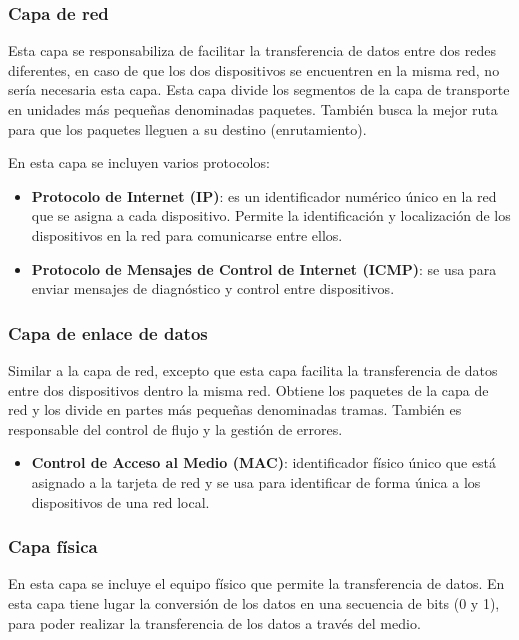 \subsubsection{Capa de red}
\label{subsubsec:CapaRed}
Esta capa se responsabiliza de facilitar la transferencia de datos entre dos redes diferentes, en caso de que los dos dispositivos se encuentren en la misma red, no sería necesaria esta capa. Esta capa divide los segmentos de la capa de transporte en unidades más pequeñas denominadas paquetes. También busca la mejor ruta para que los paquetes lleguen a su destino (enrutamiento).

En esta capa se incluyen varios protocolos:
\begin{itemize}
    \item \textbf{Protocolo de Internet (IP)}: es un identificador numérico único en la red que se asigna a cada dispositivo. Permite la identificación y localización de los dispositivos en la red para comunicarse entre ellos. 
    \item \textbf{Protocolo de Mensajes de Control de Internet (ICMP)}: se usa para enviar mensajes de diagnóstico y control entre dispositivos.
\end{itemize}

\subsubsection{Capa de enlace de datos}
\label{subsubsec:CapaEnlaceDatos}
Similar a la capa de red, excepto que esta capa facilita la transferencia de datos entre dos dispositivos dentro la misma red. Obtiene los paquetes de la capa de red y los divide en partes más pequeñas denominadas tramas. También es responsable del control de flujo y la gestión de errores.

\begin{itemize}
    \item \textbf{Control de Acceso al Medio (MAC)}: identificador físico único que está asignado a la tarjeta de red y se usa para identificar de forma única a los dispositivos de una red local.
\end{itemize}

\subsubsection{Capa física}
\label{subsubsec:CapaFisica}
En esta capa se incluye el equipo físico que permite la transferencia de datos. En esta capa tiene lugar la conversión de los datos en una secuencia de bits (0 y 1), para poder realizar la transferencia de los datos a través del medio.

